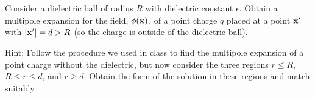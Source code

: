 \documentclass[11pt]{article}
\newenvironment{statement}[1]
{
	\section{#1}
	\color{darkgray}
	\ignorespaces
}
{
}
\begin{document}
\newcommand{\eps}{\epsilon}
\newcommand{\vx}{\vb{x}}
\newcommand{\phix}{\phi(\vx)}
\newcommand{\dcx}{\dd[3]{x}}
\newcommand{\dcxp}{\dd[3]{x'}}
\newcommand{\rhox}{\rho(\vx)}
\newcommand{\rhoxp}{\rho(\vx')}
\newcommand{\rhopxp}{\rho'(\vx')}
\newcommand{\xh}{\vec{\hat{x}}}
\newcommand{\absx}{\abs{\vx}}
\newcommand{\absxp}{\abs{\vx'}}

\newcommand{\Ylm}{Y_{l m}}
\newcommand{\qlm}{q_{l m}}
\newcommand{\Plm}{P_l^m}
\newcommand{\tht}{\theta}
\newcommand{\cost}{\cos\tht}
\newcommand{\vph}{\varphi}
\newcommand{\tv}{(\tht, \vph)}
\newcommand{\tvp}{(\tht', \vph')}
\newcommand{\Gxxp}{G(\vx, \vx')}
\newcommand{\Gpxxp}{G'(\vx, \vx')}
\newcommand{\Gdxxp}{G_D(\vx, \vx')}
\newcommand{\qplm}{q'_{l m}}

\newcommand{\lap}{\nabla^2}
\newcommand{\evphi}{\ev{\phi}}
\newcommand{\evphix}{\evphi\!(\vx)}
\newcommand{\rhof}{\rho_f}
\newcommand{\evrhof}{\ev{\rhof}}
\newcommand{\fe}{\frac{1}{\eps}}
\newcommand{\tif}{\text{if }}
\newcommand{\Al}{A_l}
\newcommand{\Bl}{B_l}
\newcommand{\Cl}{C_l}

\newcommand{\intoi}{\int_0^\infty}
\newcommand{\intono}{\int_{-1}^{1}}
\newcommand{\intotp}{\int_0^{2\pi}}
\newcommand{\drp}{\dd{r'}}
\newcommand{\dctp}{\dd{(\cost')}}
\newcommand{\dvp}{\dd{\vph'}}

\newcommand{\Ylotv}{Y_{l 0}\tv}
\newcommand{\dr}{\dd{r}}
\newcommand{\dct}{\dd{(\cost)}}
\newcommand{\ddv}{\dd{\vph}}

\newcommand{\Alm}{A_{l m}}
\newcommand{\Blm}{B_{l m}}
\newcommand{\Ploct}{P_l^0(\cost)}
\newcommand{\Ploctp}{P_l^0(\cost')}
\newcommand{\alp}{\alpha}
\newcommand{\rtp}{(r, \tht, \phi)}
\newcommand{\phirtp}{\phi\rtp}
\newcommand{\qlo}{q_{l 0}}
\newcommand{\qplo}{q'_{l 0}}
\newcommand{\qpplm}{q''_{l m}}
\newcommand{\qpplo}{q''_{l 0}}

\newcommand{\vD}{\vb{D}}
\newcommand{\evD}{\ev{\vD}}
\newcommand{\nh}{\vb{\hat{n}}}
\newcommand{\vE}{\vb{E}}
\newcommand{\evE}{\ev{\vE}}
\newcommand{\Er}{E_r}
\newcommand{\evEr}{\ev{\Er}}
\newcommand{\rh}{\vb{\hat{r}}}

\newcommand{\dint}{\displaystyle \int}
\newcommand{\dsum}{\displaystyle \sum}

\begin{statement}{} \label{1}
	Consider a dielectric ball of radius $R$ with dielectric constant $\eps$.  Obtain a multipole expansion for the field, $\phix$, of a point charge $q$ placed at a point $\vx'$ with $\abs{\vx'} = d > R$ (so the charge is outside of the dielectric ball).
	
	Hint: Follow the procedure we used in class to find the multipole expansion of a point charge without the dielectric, but now consider the three regions $r \leq R$, $R \leq r \leq d$, and $r \geq d$.  Obtain the form of the solution in these regions and match suitably.
\end{statement}
\end{document}

